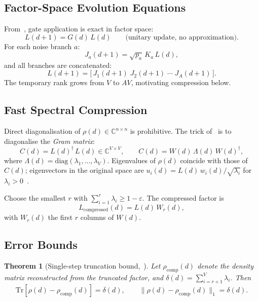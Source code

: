 \documentclass[11pt,a4paper]{article}
\newtheorem{theorem}{Theorem}[section]
\begin{document}
\subsection{Factor-Space Evolution Equations}
\label{sec:math-evo}

From~\cite{chen2021lret}, gate application is exact in factor space:
\begin{equation}
  L(d+1) = G(d)\,L(d) \qquad\text{(unitary update, no approximation)}.
\end{equation}
For each noise branch $a$:
\begin{equation}
  J_{a}(d+1) = \sqrt{p_a}\,K_a\,L(d),
\end{equation}
and all branches are concatenated:
\begin{equation}
  L(d+1) = \bigl[\,J_1(d+1)\;J_2(d+1)\;\cdots\;J_A(d+1)\,\bigr].
\end{equation}
The temporary rank grows from $V$ to $AV$, motivating compression below.

\subsection{Fast Spectral Compression}
\label{sec:math-compress}

Direct diagonalisation of $\rho(d) \in \mathbb{C}^{n\times n}$ is prohibitive.
The trick of~\cite{chen2021lret} is to diagonalise the \emph{Gram matrix}:
\begin{equation}
  C(d) = L(d)^\dagger\, L(d) \in \mathbb{C}^{V \times V},\qquad
  C(d) = W(d)\,\Lambda(d)\,W(d)^\dagger,
\end{equation}
where $\Lambda(d) = \mathrm{diag}(\lambda_1,\ldots,\lambda_V)$. Eigenvalues of
$\rho(d)$ coincide with those of $C(d)$; eigenvectors in the original space are
$u_i(d) = L(d)\,w_i(d)/\sqrt{\lambda_i}$ for $\lambda_i > 0$~\cite{chen2021lret}.

Choose the smallest $r$ with $\sum_{i=1}^{r}\lambda_i \ge 1-\varepsilon$. The
compressed factor is
\begin{equation}
  L_{\mathrm{compressed}}(d) = L(d)\,W_r(d),
\end{equation}
with $W_r(d)$ the first $r$ columns of $W(d)$.

\subsection{Error Bounds}
\label{sec:math-errors}

\begin{theorem}[Single-step truncation bound,~\cite{chen2021lret}]
Let $\rho_{\mathrm{comp}}(d)$ denote the density matrix reconstructed from the
truncated factor, and $\delta(d) = \sum_{i=r+1}^{V} \lambda_i$. Then
\begin{equation}
  \mathrm{Tr}[\rho(d)-\rho_{\mathrm{comp}}(d)] = \delta(d),\qquad
  \|\rho(d)-\rho_{\mathrm{comp}}(d)\|_1 = \delta(d).
\end{equation}
\end{theorem}
\end{document}
